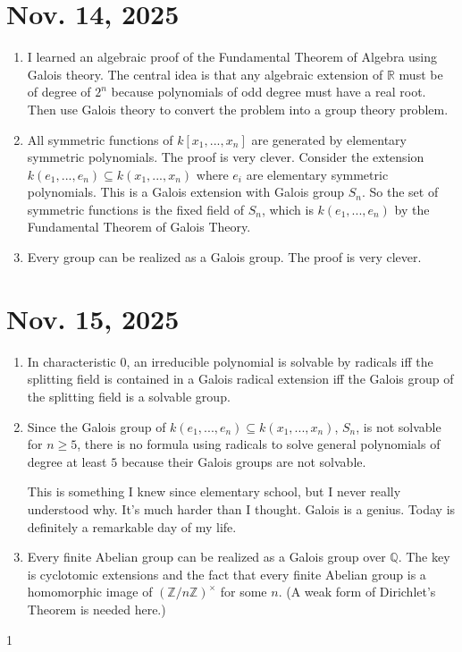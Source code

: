 \documentclass[15pt]{scrartcl}
\newcommand{\R}{\mathbb{R}}
\newcommand{\Q}{\mathbb{Q}}
\newcommand{\Z}{\mathbb{Z}}
\begin{document}
\section{Nov. 14, 2025}
\begin{enumerate}
\item I learned an algebraic proof of the Fundamental Theorem of Algebra using Galois theory. The central idea is that any algebraic extension of $\R$ must be of degree of $2^n$ because polynomials of odd degree must have a real root. Then use Galois theory to convert the problem into a group theory problem.
\item All symmetric functions of $k[x_1,...,x_n]$ are generated by elementary symmetric polynomials. The proof is very clever. Consider the extension $k(e_1,...,e_n)\subseteq k(x_1,...,x_n)$ where $e_i$ are elementary symmetric polynomials. This is a Galois extension with Galois group $S_n$. So the set of symmetric functions is the fixed field of $S_n$, which is $k(e_1,...,e_n)$ by the Fundamental Theorem of Galois Theory.
\item Every group can be realized as a Galois group. The proof is very clever. 
\end{enumerate}
\section{Nov. 15, 2025}
\begin{enumerate}
\item In characteristic $0$, an irreducible polynomial is solvable by radicals iff the splitting field is contained in a Galois radical extension iff the Galois group of the splitting field is a solvable group.
\item Since the Galois group of $k(e_1,...,e_n)\subseteq k(x_1,...,x_n)$, $S_n$, is not solvable for $n\geq 5$, there is no formula using radicals to solve general polynomials of degree at least $5$ because their Galois groups are not solvable. 
\begin{remark}
    This is something I knew since elementary school, but I never really understood why. It's much harder than I thought. Galois is a genius. Today is definitely a remarkable day of my life.
\end{remark}
\item Every finite Abelian group can be realized as a Galois group over $\Q$. The key is cyclotomic extensions and the fact that every finite Abelian group is a homomorphic image of $(\Z/n\Z)^{\times}$ for some $n$. (A weak form of Dirichlet's Theorem is needed here.)
\end{enumerate}

1
\end{document}
